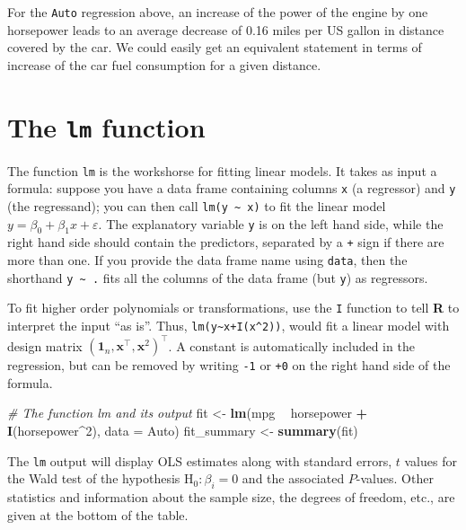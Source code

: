\documentclass[]{book}
\newenvironment{Shaded}{\begin{snugshade}}{\end{snugshade}}
\newcommand{\KeywordTok}[1]{\textcolor[rgb]{0.13,0.29,0.53}{\textbf{#1}}}
\newcommand{\DataTypeTok}[1]{\textcolor[rgb]{0.13,0.29,0.53}{#1}}
\newcommand{\DecValTok}[1]{\textcolor[rgb]{0.00,0.00,0.81}{#1}}
\newcommand{\StringTok}[1]{\textcolor[rgb]{0.31,0.60,0.02}{#1}}
\newcommand{\CommentTok}[1]{\textcolor[rgb]{0.56,0.35,0.01}{\textit{#1}}}
\newcommand{\OperatorTok}[1]{\textcolor[rgb]{0.81,0.36,0.00}{\textbf{#1}}}
\newcommand{\NormalTok}[1]{#1}
\theoremstyle{definition}
\theoremstyle{definition}
\theoremstyle{definition}
\theoremstyle{remark}
\begin{document}
For the \texttt{Auto} regression above, an increase of the power of the
engine by one horsepower leads to an average decrease of 0.16 miles per
US gallon in distance covered by the car. We could easily get an
equivalent statement in terms of increase of the car fuel consumption
for a given distance.

\section{\texorpdfstring{The \texttt{lm}
function}{The lm function}}\label{the-lm-function}

The function \texttt{lm} is the workshorse for fitting linear models. It
takes as input a formula: suppose you have a data frame containing
columns \texttt{x} (a regressor) and \texttt{y} (the regressand); you
can then call \texttt{lm(y\ \textasciitilde{}\ x)} to fit the linear
model \(y = \beta_0 + \beta_1x + \varepsilon\). The explanatory variable
\texttt{y} is on the left hand side, while the right hand side should
contain the predictors, separated by a \texttt{+} sign if there are more
than one. If you provide the data frame name using \texttt{data}, then
the shorthand \texttt{y\ \textasciitilde{}\ .} fits all the columns of
the data frame (but \texttt{y}) as regressors.

To fit higher order polynomials or transformations, use the \texttt{I}
function to tell \textbf{R} to interpret the input ``as is''. Thus,
\texttt{lm(y\textasciitilde{}x+I(x\^{}2))}, would fit a linear model
with design matrix
\((\boldsymbol{1}_n, \mathbf{x}^\top, \mathbf{x}^2)^\top\). A constant
is automatically included in the regression, but can be removed by
writing \texttt{-1} or \texttt{+0} on the right hand side of the
formula.

\begin{Shaded}
\begin{Highlighting}[]
\CommentTok{# The function lm and its output}
\NormalTok{fit <-}\StringTok{ }\KeywordTok{lm}\NormalTok{(mpg }\OperatorTok{~}\StringTok{ }\NormalTok{horsepower }\OperatorTok{+}\StringTok{ }\KeywordTok{I}\NormalTok{(horsepower}\OperatorTok{^}\DecValTok{2}\NormalTok{), }\DataTypeTok{data =}\NormalTok{ Auto)}
\NormalTok{fit_summary <-}\StringTok{ }\KeywordTok{summary}\NormalTok{(fit)}
\end{Highlighting}
\end{Shaded}

The \texttt{lm} output will display OLS estimates along with standard
errors, \(t\) values for the Wald test of the hypothesis
\(\mathrm{H}_0: \beta_i=0\) and the associated \(P\)-values. Other
statistics and information about the sample size, the degrees of
freedom, etc., are given at the bottom of the table.
\end{document}
